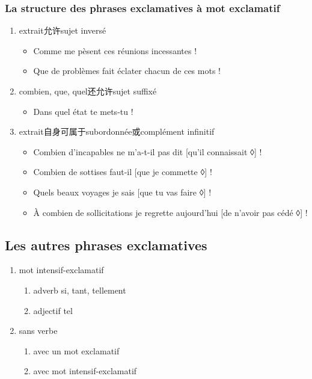 \documentclass[UTF8]{report}
\begin{document}
\subsubsection{La structure des phrases exclamatives à mot exclamatif}

\begin{enumerate}
    \item extrait允许sujet inversé
    \begin{itemize}
        \item Comme me pèsent ces réunions incessantes !
        \item Que de problèmes fait éclater chacun de ces mots ! 
    \end{itemize}
    \item combien, que, quel还允许sujet suffixé
    \begin{itemize}
        \item Dans quel état te mets-tu !
    \end{itemize}
    \item extrait自身可属于subordonnée或complément infinitif
    \begin{itemize}
        \item Combien d’incapables ne m’a-t-il pas dit [qu’il connaissait ◊] !
        \item Combien de sottises faut-il [que je commette ◊] !
        \item Quels beaux voyages je sais [que tu vas faire ◊] !
        \item À combien de sollicitations je regrette aujourd’hui [de n’avoir pas cédé ◊] !
    \end{itemize}
\end{enumerate}

\subsection{Les autres phrases exclamatives}
\begin{enumerate}
    \item mot intensif-exclamatif
    \begin{enumerate}
        \item adverb si, tant, tellement
        \item adjectif tel
    \end{enumerate}
    \item sans verbe 
    \begin{enumerate}
        \item avec un mot exclamatif
        \item avec mot intensif-exclamatif
    \end{enumerate}
\end{enumerate}
\end{document}
